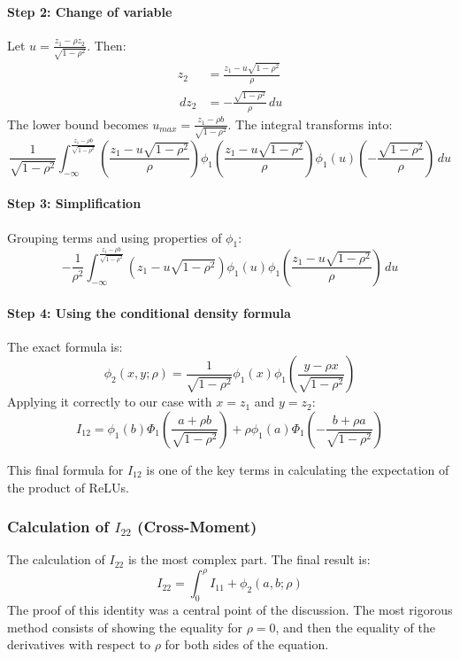 \documentclass[11pt, a4paper]{article}
\newcommand{\dd}{\,d} %
\begin{document}
\paragraph{Step 2: Change of variable}
Let $u = \frac{z_1-\rho z_2}{\sqrt{1-\rho^2}}$. Then:
\begin{align*}
z_2 &= \frac{z_1-u\sqrt{1-\rho^2}}{\rho} \\
\dd z_2 &= -\frac{\sqrt{1-\rho^2}}{\rho} \dd u
\end{align*}
The lower bound becomes $u_{max} = \frac{z_1-\rho b}{\sqrt{1-\rho^2}}$. The integral transforms into:
\[
\frac{1}{\sqrt{1-\rho^2}} \int_{-\infty}^{\frac{z_1-\rho b}{\sqrt{1-\rho^2}}} \left(\frac{z_1-u\sqrt{1-\rho^2}}{\rho}\right) \phi_1\left(\frac{z_1-u\sqrt{1-\rho^2}}{\rho}\right) \phi_1(u) \left(-\frac{\sqrt{1-\rho^2}}{\rho}\right) \dd u
\]

\paragraph{Step 3: Simplification}
Grouping terms and using properties of $\phi_1$:
\[
-\frac{1}{\rho^2} \int_{-\infty}^{\frac{z_1-\rho b}{\sqrt{1-\rho^2}}} (z_1-u\sqrt{1-\rho^2}) \phi_1(u) \phi_1\left(\frac{z_1-u\sqrt{1-\rho^2}}{\rho}\right) \dd u
\]

\paragraph{Step 4: Using the conditional density formula}
The exact formula is:
\[
\phi_2(x,y;\rho) = \frac{1}{\sqrt{1-\rho^2}} \phi_1(x) \phi_1\left(\frac{y-\rho x}{\sqrt{1-\rho^2}}\right)
\]
Applying it correctly to our case with $x=z_1$ and $y=z_2$:
\[
I_{12} = \phi_1(b)\Phi_1\left(\frac{a+\rho b}{\sqrt{1-\rho^2}}\right) + \rho\phi_1(a)\Phi_1\left(-\frac{b+\rho a}{\sqrt{1-\rho^2}}\right)
\]

This final formula for $I_{12}$ is one of the key terms in calculating the expectation of the product of ReLUs.



\subsubsection*{Calculation of $I_{22}$ (Cross-Moment)}
The calculation of $I_{22}$ is the most complex part. The final result is:
\[
I_{22} = \int_0^\rho I_{11} + \phi_2(a, b; \rho)
\]
The proof of this identity was a central point of the discussion. The most rigorous method consists of showing the equality for $\rho=0$, and then the equality of the derivatives with respect to $\rho$ for both sides of the equation.
\end{document}
